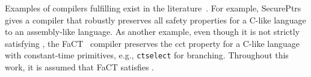Examples of compilers fulfilling  exist in the literature~\cite{korashy2022secureptrs,korashy2021capableptrs,abate2021extacc,abate2019jour,patrignani2021rsc}.
For example, SecurePtrs~\cite{korashy2022secureptrs} gives a compiler that robustly preserves all safety properties for a C-like language to an assembly-like language. 
As another example, even though it is not strictly satisfying , the FaCT~\cite{cauligi2019fact} compiler preserves the \gls*{cct} property for a C-like language with constant-time primitives, e.g., \texttt{ctselect} for branching. %
Throughout this work, it is assumed that FaCT satisfies .

